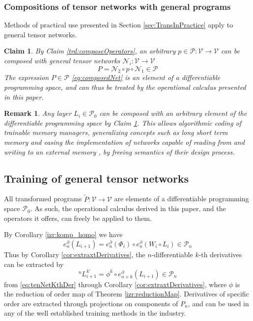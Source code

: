 \documentclass[preprint,12pt]{elsarticle}
\newcommand{\VV}{\mathcal{V}}
\newcommand{\NN}{\mathcal{N}}
\newcommand{\dP}{\mathcal{P}}
\newcommand{\D}{\partial}
\newtheorem{trditev}{Claim}[section]
\newtheorem{opomba}{Remark}[section]
\begin{document}
\subsubsection{Compositions of tensor networks with general programs}\label{sec:compoNetProg}

Methods of practical use presented in Section \ref{sec:TransInPractice} apply to general tensor networks.
\begin{trditev}\label{clm:composedNet}
By Claim \ref{trd:composeOperators}, an arbitrary $p\in\dP:\VV\to\VV$ can be composed with general tensor networks $\NN_i:\VV\to\VV$ 
\begin{equation}\label{eq:composedNet}
P=\NN_2\circ p\circ\NN_1 \in \dP
\end{equation}
The expression $P\in\dP$ \eqref{eq:composedNet} is an element of a differentiable programming space, and can thus be treated by the operational calculus presented in this paper. 
\end{trditev}

\begin{opomba}
Any layer $L_i\in\dP_0$ can be composed with an arbitrary element of the differentiable programming space by Claim  \ref{clm:composedNet}. This allows algorithmic coding of trainable memory managers, generalizing concepts such as long short term memory \cite{LSTM} and easing the implementation of networks capable of reading from and writing to an external memory \cite{netRam}, by freeing semantics of their design process.
\end{opomba}

\subsection{Training of general tensor networks}\label{sec:trainNet}

All transformed programs $\tilde{P}:\VV\to\VV$ are elements of a differentiable programming space $\dP_0$. As such, the operational calculus derived in this paper, and the operators it offers, can freely be applied to them.

By Corollary \ref{izr:komp_homo} we have
\begin{equation}\label{eq:tenNetKthDer}
e^\D_n(L_{i+1})=e^\D_n(\Phi_i)\circ e^\D_n(W_i\circ L_i)\in\dP_n
\end{equation}
Thus by Corollary \ref{cor:extraxtDerivatives}, the $n$-differentiable $k$-th derivatives can be extracted by
\begin{equation}
^{n}L_{i+1}^{k\prime}=\phi^k\circ e^\D_{n+k}(L_{i+1})\in\dP_n
\end{equation}
from \eqref{eq:tenNetKthDer} through Corollary \ref{cor:extraxtDerivatives}, where $\phi$ is the reduction of order map of Theorem \ref{izr:reductionMap}. Derivatives of specific order are extracted through projections on components of $P_n$, and can be used in any of the well established training methods in the industry. 
\end{document}
